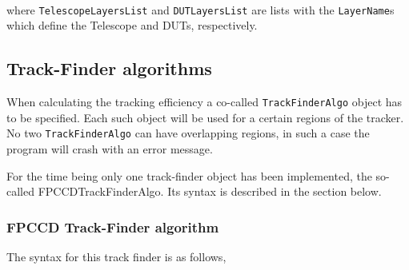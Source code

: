 ~\\
\noindent
where {\tt TelescopeLayersList} and {\tt DUTLayersList} are lists with the {\tt LayerName}s which define the Telescope and DUTs, respectively.

\subsection{Track-Finder algorithms}
\label{subsec::TrkFinder_config}

When calculating the tracking efficiency a co-called {\tt TrackFinderAlgo} object has to be specified. Each such object will be used 
for a certain regions of the tracker. No two {\tt TrackFinderAlgo} can have overlapping regions, in such a case the program will crash with 
an error message.

For the time being only one track-finder object has been implemented, the so-called FPCCDTrackFinderAlgo. Its syntax is described in the section 
below.

\subsubsection{FPCCD Track-Finder algorithm}

The syntax for this track finder is as follows,

